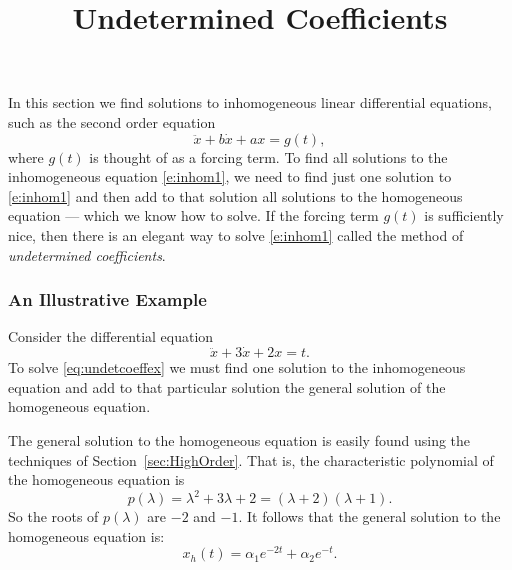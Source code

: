 \documentclass{ximera}
\title{Undetermined Coefficients}
\begin{document}
\begin{abstract}
\end{abstract}
\maketitle


\label{sec:2norderinhom}

In this section we find solutions to inhomogeneous linear differential 
equations, such as the second order equation
\begin{equation}  \label{e:inhom1}
\ddot{x} + b\dot{x} + ax = g(t),
\end{equation}
where $g(t)$ is thought of as a forcing term.   
To find all solutions to 
the inhomogeneous 
equation \eqref{e:inhom1}, we need to find just one solution
to \eqref{e:inhom1} and then add to that solution all solutions to the 
homogeneous equation --- which we know how to solve.  If the forcing term 
$g(t)$ is sufficiently nice, then there is an elegant way to solve 
\eqref{e:inhom1} called the method of 
{\em undetermined coefficients}.


\subsubsection*{An Illustrative Example}

Consider the differential equation
\begin{equation}  \label{eq:undetcoeffex}
\ddot{x} + 3\dot{x}+2x = t.
\end{equation}
To solve \eqref{eq:undetcoeffex} we must find one solution to the inhomogeneous
equation and add to that particular solution the 
general solution of the 
homogeneous equation.  

The general solution to the homogeneous equation is easily found using the
techniques of Section~\ref{sec:HighOrder}.  That is, the characteristic 
polynomial of the homogeneous equation is 
\[
p(\lambda) = \lambda^2 + 3\lambda + 2 = (\lambda+2)(\lambda+1).
\]
So the roots of $p(\lambda)$ are $-2$ and $-1$.  It follows that the general
solution to the homogeneous equation is:
\[
x_h(t)= \alpha_1e^{-2t} + \alpha_2e^{-t}.
\]
\end{document}
